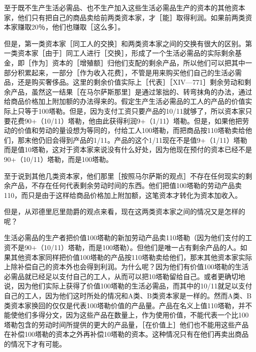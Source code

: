 至于既不生产生活必需品、也不生产加入这些生活必需品生产的资本的其他资本家，他们只有把自己的商品卖给前两类资本家，才［能］取得利润。如果前两类资本家赚取20％，他们也赚取［这么多］。

但是，第一类资本家［同工人的交换］和两类资本家之间的交换有很大的区别。第一类资本家［由于］同工人进行［交换］，形成了一个生活必需品的实际剩余基金，即［作为］资本的［增殖额］归他们支配的剩余产品，所以他们可以把其中一部分积累起来，一部分［作为收入花费］，不管是用来购买他们自己的生活必需品，还是购买奢侈品。这里的剩余价值实际上［代表］［XIV—771］剩余劳动和剩余产品，虽然这一结果［在马尔萨斯那里］是通过笨拙的、转弯抹角的办法，通过给商品价格加上附加额的办法得来的。假定生产生活必需品的工人的产品的价值实际上只等于100塔勒。但是，因为支付工资只要产品的10/11就够了，所以资本家只要花费90+（10/11）塔勒，他由此获得利润9+（1/11）塔勒。但是，如果他把劳动的价值和劳动的量设想为等同的，付给工人100塔勒，而把商品按110塔勒卖给他们，那末他仍旧会得到产品的1/11。产品的这个1/11现在不是值9+（1/11）塔勒而是值10塔勒，这对于资本家来说没有什么好处，因为他现在预付的资本已经不是90+（10/11）塔勒，而是100塔勒。

至于说到其他几类资本家，他们那里［按照马尔萨斯的观点］不存在任何现实的剩余产品，不存在任何代表剩余劳动时间的东西。他们把值100塔勒的劳动产品卖110，而只是由于这样给商品价格加上附加额，这笔资本才转化为资本加收入。

但是，从邓德里厄里勋爵的观点来看，现在这两类资本家之间的情况又是怎样的呢？

生活必需品的生产者把价值100塔勒的新加劳动产品卖110塔勒（因为他们支付的工资不是90+（10/11）塔勒，而是100塔勒）。但他们是唯一占有剩余产品的人。如果其他资本家同样把价值100塔勒的产品按110塔勒卖给他们，那末其他资本家实际上除补偿自己的资本外也会得到利润。为什么呢？因为他们有价值100塔勒的生活必需品就已经足以支付自己的工人，从而可以把10塔勒留给自己。或者更确切地说，因为他们实际上获得了价值100塔勒的生活必需品，而其中的10/11就足以支付自己的工人，因为他们这时所处的情况和A类、B类资本家是一样的。然而A类、B类资本家换回的仅仅是代表100塔勒价值的产品量。产品在名义上值110塔勒，并不能使他们多得分文，因为这些产品在数量上，作为使用价值，不能代表一个比100塔勒包含的劳动时间所提供的更大的产品量，［在价值上］他们也不能用这些产品在补偿100塔勒的资本之外再补偿10塔勒的资本。这种情况只有在他们再卖出商品的情况下才有可能。

